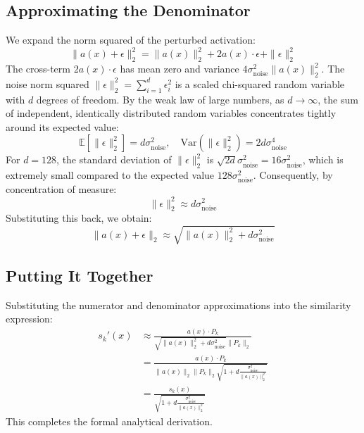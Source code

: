 \documentclass{article}
\theoremstyle{plain}
\theoremstyle{definition}
\theoremstyle{remark}
\begin{document}
\subsection{Approximating the Denominator}
We expand the norm squared of the perturbed activation:
\begin{equation}
    \|a(x) + \epsilon\|_2^2 = \|a(x)\|_2^2 + 2 a(x) \cdot \epsilon + \|\epsilon\|_2^2
\end{equation}
The cross-term $2 a(x) \cdot \epsilon$ has mean zero and variance $4 \sigma_{\text{noise}}^2 \|a(x)\|_2^2$.
The noise norm squared $\|\epsilon\|_2^2 = \sum_{i=1}^d \epsilon_i^2$ is a scaled chi-squared random variable with $d$ degrees of freedom. By the weak law of large numbers, as $d \to \infty$, the sum of independent, identically distributed random variables concentrates tightly around its expected value:
\begin{equation}
    \mathbb{E}[\|\epsilon\|_2^2] = d \sigma_{\text{noise}}^2, \quad \text{Var}(\| \epsilon\|_2^2) = 2 d \sigma_{\text{noise}}^4
\end{equation}
For $d = 128$, the standard deviation of $\|\epsilon\|_2^2$ is $\sqrt{2d} \sigma_{\text{noise}}^2 = 16 \sigma_{\text{noise}}^2$, which is extremely small compared to the expected value $128 \sigma_{\text{noise}}^2$. Consequently, by concentration of measure:
\begin{equation}
    \|\epsilon\|_2^2 \approx d \sigma_{\text{noise}}^2
\end{equation}
Substituting this back, we obtain:
\begin{equation}
    \|a(x) + \epsilon\|_2 \approx \sqrt{\|a(x)\|_2^2 + d \sigma_{\text{noise}}^2}
\end{equation}

\subsection{Putting It Together}
Substituting the numerator and denominator approximations into the similarity expression:
\begin{align}
    s_k'(x) &\approx \frac{a(x) \cdot P_k}{\sqrt{\|a(x)\|_2^2 + d \sigma_{\text{noise}}^2} \|P_k\|_2} \nonumber \\
            &= \frac{a(x) \cdot P_k}{\|a(x)\|_2 \|P_k\|_2 \sqrt{1 + d \frac{\sigma_{\text{noise}}^2}{\|a(x)\|_2^2}}} \nonumber \\
            &= \frac{s_k(x)}{\sqrt{1 + d \frac{\sigma_{\text{noise}}^2}{\|a(x)\|_2^2}}}
\end{align}
This completes the formal analytical derivation.
\end{document}
